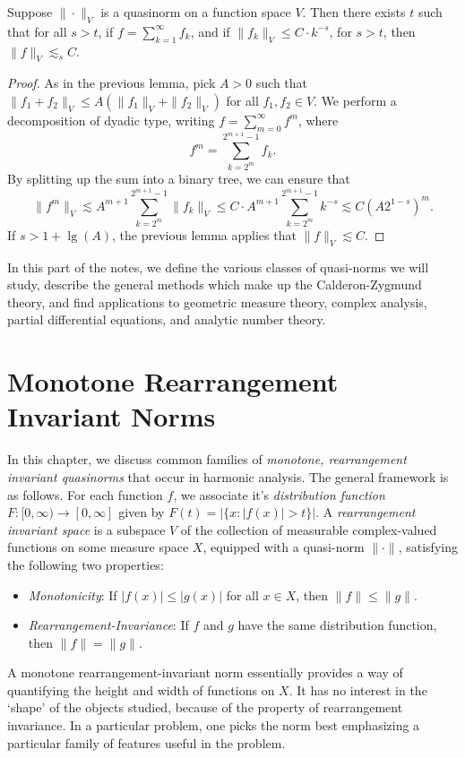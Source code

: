\begin{lemma}
    Suppose $\| \cdot \|_V$ is a quasinorm on a function space $V$. Then there exists $t$ such that for all $s > t$, if $f = \sum_{k = 1}^\infty f_k$, and if $\| f_k \|_V \leq C \cdot k^{-s}$, for $s > t$, then $\| f \|_V \lesssim_s C$.
\end{lemma}
\begin{proof}
    As in the previous lemma, pick $A > 0$ such that $\| f_1 + f_2 \|_V \leq A (\| f_1 \|_V + \| f_2 \|_V)$ for all $f_1,f_2 \in V$. We perform a decomposition of dyadic type, writing $f = \sum_{m = 0}^\infty f^m$, where
    \[ f^m = \sum_{k = 2^m}^{2^{m+1} - 1} f_k. \]
    By splitting up the sum into a binary tree, we can ensure that
    \[ \| f^m \|_V \lesssim A^{m+1} \sum_{k = 2^m}^{2^{m+1} - 1} \| f_k \|_V \leq C \cdot A^{m+1} \sum_{k = 2^m}^{2^{m+1} - 1} k^{-s} \lesssim C (A 2^{1-s})^m. \]
    If $s > 1 + \lg(A)$, the previous lemma applies that $\| f \|_V \lesssim C$.
\end{proof}

In this part of the notes, we define the various classes of quasi-norms we will study, describe the general methods which make up the Calderon-Zygmund theory, and find applications to geometric measure theory, complex analysis, partial differential equations, and analytic number theory.





\chapter{Monotone Rearrangement Invariant Norms}

In this chapter, we discuss common families of \emph{monotone, rearrangement invariant quasinorms} that occur in harmonic analysis. The general framework is as follows. For each function $f$, we associate it's \emph{distribution function} $F: [0,\infty) \to [0,\infty]$ given by $F(t) = |\{ x : |f(x)| > t \}|$. A \emph{rearrangement invariant space} is a subspace $V$ of the collection of measurable complex-valued functions on some measure space $X$, equipped with a quasi-norm $\| \cdot \|$, satisfying the following two properties:
%
\begin{itemize}
    \item \emph{Monotonicity}: If $|f(x)| \leq |g(x)|$ for all $x \in X$, then $\| f \| \leq \| g \|$.

    \item \emph{Rearrangement-Invariance}: If $f$ and $g$ have the same distribution function, then $\| f \| = \| g \|$.
\end{itemize}
%
A monotone rearrangement-invariant norm essentially provides a way of quantifying the height and width of functions on $X$. It has no interest in the `shape' of the objects studied, because of the property of rearrangement invariance. In a particular problem, one picks the norm best emphasizing a particular family of features useful in the problem.

